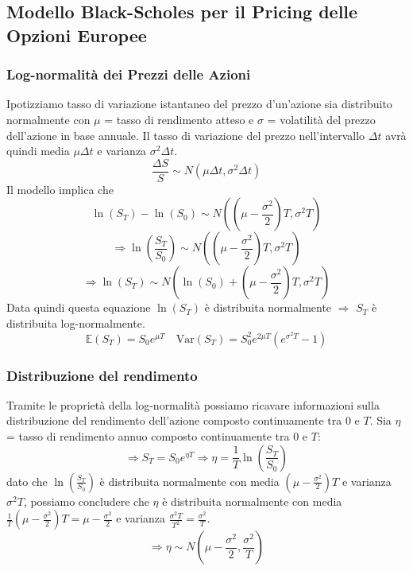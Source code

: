 \documentclass[12pt,a4paper]{report}
\begin{document}
\subsection{Modello Black-Scholes per il Pricing delle Opzioni Europee}
\subsubsection{Log-normalità dei Prezzi delle Azioni}
Ipotizziamo tasso di variazione istantaneo del prezzo d'un'azione sia distribuito normalmente con \(\mu\) = tasso di rendimento atteso e \(\sigma\) = volatilità del prezzo dell'azione in base annuale.
Il tasso di variazione del prezzo nell'intervallo \(\Delta t\) avrà quindi media \(\mu \Delta t\) e varianza \(\sigma^2 \Delta t\).
\[
\frac{\Delta S}{S} \sim N\left( \mu \Delta t, \sigma^2 \Delta t \right)
\]
Il modello implica che 
\[
\ln(S_T) - \ln(S_0) \sim N\left( \left( \mu - \frac{\sigma^2}{2} \right) T, \sigma^2 T \right)
\]
\[
\Longrightarrow \ln(\frac{S_T}{S_0}) \sim N\left( \left( \mu - \frac{\sigma^2}{2} \right) T, \sigma^2 T \right)
\]
\[
\Longrightarrow \ln(S_T) \sim N\left( \ln(S_0) + \left( \mu - \frac{\sigma^2}{2} \right) T, \sigma^2 T \right)
\]
Data quindi questa equazione \(\ln(S_T)\) è distribuita normalmente \(\Longrightarrow\) \(S_T\) è distribuita log-normalmente.
\[
\mathbb{E}(S_T) = S_0 e^{\mu T}
\quad
\mathrm{Var}(S_T) = S_0^2 e^{2\mu T} \left( e^{\sigma^2 T} - 1 \right)
\]

\subsubsection{Distribuzione del rendimento}
Tramite le proprietà della log-normalità possiamo ricavare informazioni sulla distribuzione del rendimento dell'azione composto continuamente tra \(0\) e \(T\).
\newline
Sia \(\eta\) = tasso di rendimento annuo composto continuamente tra \(0\) e \(T\):
\[
\Longrightarrow S_T = S_0 e^{\eta T} \Longrightarrow \eta = \frac{1}{T} \ln\left(\frac{S_T}{S_0}\right)
\]
dato che \(\ln(\frac{S_T}{S_0})\) è distribuita normalmente con media \(\left( \mu - \frac{\sigma^2}{2} \right) T\) e varianza \(\sigma^2 T\), possiamo concludere che \(\eta\) è distribuita normalmente con media \(\frac{1}{T} \left( \mu - \frac{\sigma^2}{2} \right) T = \mu - \frac{\sigma^2}{2}\) e varianza \(\frac{\sigma^2 T}{T^2} = \frac{\sigma^2}{T}\).
\[
\Longrightarrow \eta \sim N\left( \mu - \frac{\sigma^2}{2}, \frac{\sigma^2}{T} \right)
\]

\newpage
\end{document}
